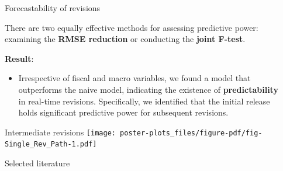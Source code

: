 \documentclass[final]{beamer}
\newlength{\sepwidth}
\newlength{\colwidth}
\newcommand{\separatorcolumn}{\begin{column}{\sepwidth}\end{column}}
\begin{document}
\begin{frame}[t]
\begin{columns}[t]
\begin{column}{\colwidth}
\begin{block}{Forecastability of revisions}
    \vspace*{0.5cm}

    There are two equally effective methods for assessing predictive power: examining the \textbf{RMSE reduction} or conducting the \textbf{joint F-test}.

    \vspace*{0.5cm}
    \textbf{Result}:
    \begin{itemize}
      \item Irrespective of fiscal and macro variables, we found a model that outperforms the naive model, indicating the existence of \textbf{predictability} in real-time revisions. Specifically, we identified that the initial release holds significant predictive power for subsequent revisions.
    \end{itemize} 

  \end{block}

  \begin{block}{Intermediate revisions}
    \texttt{[image: poster-plots\_files/figure-pdf/fig-Single\_Rev\_Path-1.pdf]} 

  \end{block}

  \begin{block}{Selected literature}
    \nocite{*}
    \footnotesize{}

  \end{block}

\end{column}

\separatorcolumn
\end{columns}
\end{frame}
\end{document}
